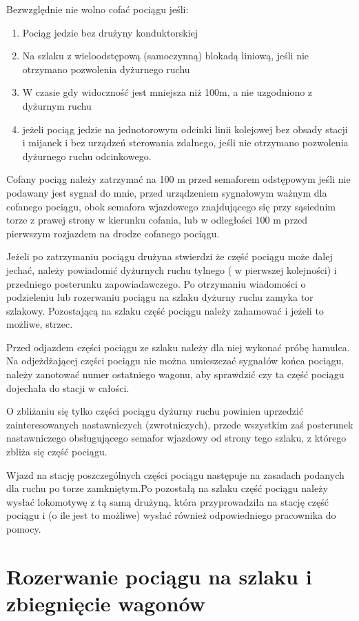 Bezwzględnie nie wolno cofać pociągu jeśli:

\begin{enumerate}
\item Pociąg jedzie bez drużyny konduktorskiej
\item Na szlaku z wieloodstępową (samoczynną) blokadą liniową, jeśli nie otrzymano pozwolenia dyżurnego ruchu
\item W czasie gdy widoczność jest mniejsza niż 100m, a nie uzgodniono z dyżurnym ruchu
\item jeżeli pociąg jedzie na jednotorowym odcinki linii kolejowej bez obsady stacji i mijanek i bez urządzeń sterowania
zdalnego, jeśli nie otrzymano pozwolenia dyżurnego ruchu odcinkowego.
\end{enumerate}
Cofany pociąg należy zatrzymać na 100 m przed semaforem odstępowym jeśli nie podawany jest sygnał do mnie, przed
urządzeniem sygnałowym ważnym dla cofanego pociągu, obok semafora wjazdowego znajdującego się przy sąsiednim torze z
prawej strony w kierunku cofania, lub w odległości 100 m przed pierwszym rozjazdem na drodze cofanego pociągu.

Jeżeli po zatrzymaniu pociągu drużyna stwierdzi że część pociągu może dalej jechać, należy powiadomić dyżurnych ruchu tylnego ( w pierwszej kolejności) i przedniego posterunku zapowiadawczego. Po otrzymaniu wiadomości o podzieleniu lub rozerwaniu pociągu na szlaku dyżurny ruchu zamyka tor szlakowy. Pozostającą na szlaku część pociągu należy zahamować i jeżeli to możliwe, strzec.

Przed odjazdem części pociągu ze szlaku należy dla niej wykonać próbę hamulca. Na odjeżdżającej części pociągu nie można umieszczać sygnałów końca pociągu, należy zanotować numer ostatniego wagonu, aby sprawdzić czy ta część pociągu dojechała do stacji w całości.

O zbliżaniu się tylko części pociągu dyżurny ruchu powinien uprzedzić zainteresowanych nastawniczych (zwrotniczych), przede wszystkim zaś posterunek nastawniczego obsługującego semafor wjazdowy od strony tego szlaku, z którego zbliża
się część pociągu.

Wjazd na stację poszczególnych części pociągu następuje na zasadach podanych dla ruchu po torze zamkniętym.Po pozostałą na szlaku część pociągu należy wysłać lokomotywę z tą samą drużyną, która przyprowadziła na stację część pociągu i (o
ile jest to możliwe) wysłać również odpowiedniego pracownika do pomocy.

\section{Rozerwanie pociągu na szlaku i zbiegnięcie wagonów}


